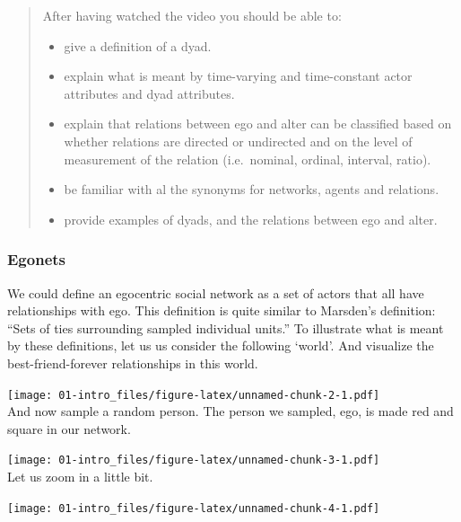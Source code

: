 \documentclass[
]{book}
\providecommand{\tightlist}{%
  \setlength{\itemsep}{0pt}\setlength{\parskip}{0pt}}
\begin{document}
\begin{quote}
After having watched the video you should be able to:

\begin{itemize}
\tightlist
\item
  give a definition of a dyad.\\
\item
  explain what is meant by time-varying and time-constant actor attributes and dyad attributes.\\
\item
  explain that relations between ego and alter can be classified based on whether relations are directed or undirected and on the level of measurement of the relation (i.e.~nominal, ordinal, interval, ratio).\\
\item
  be familiar with al the synonyms for networks, agents and relations.\\
\item
  provide examples of dyads, and the relations between ego and alter.\\
\end{itemize}
\end{quote}

\hypertarget{egonets}{%
\subsubsection*{\texorpdfstring{\textbf{Egonets}}{Egonets}}\label{egonets}}

We could define an egocentric social network as a set of actors that all have relationships with ego. This definition is quite similar to Marsden's \citep{marsden1990} definition: ``Sets of ties surrounding sampled individual units.'' To illustrate what is meant by these definitions, let us us consider the following `world'. And visualize the best-friend-forever relationships in this world.

\texttt{[image: 01-intro\_files/figure-latex/unnamed-chunk-2-1.pdf]}\\
And now sample a random person. The person we sampled, ego, is made red and square in our network.

\texttt{[image: 01-intro\_files/figure-latex/unnamed-chunk-3-1.pdf]}\\
Let us zoom in a little bit.

\texttt{[image: 01-intro\_files/figure-latex/unnamed-chunk-4-1.pdf]}
\end{document}
